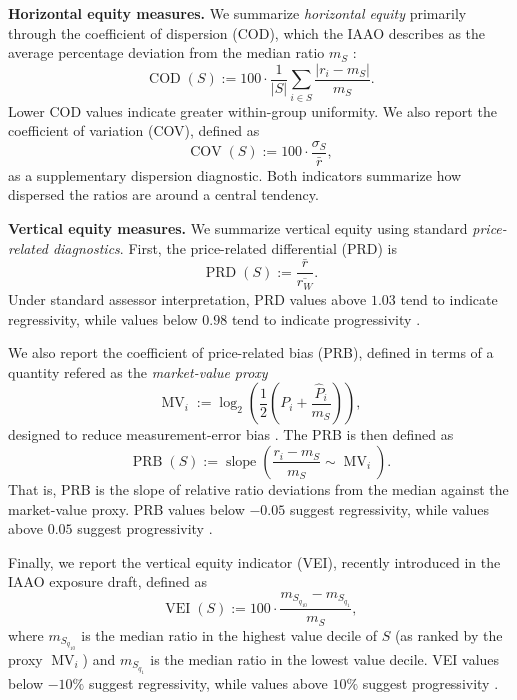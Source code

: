 \documentclass[12pt, draft]{article}
\theoremstyle{plain}
\theoremstyle{definition}
\newcommand{\1}{\mathbf{1}}
\begin{document}
{\medskip
\noindent\textbf{Horizontal equity measures.}
We summarize \textit{horizontal equity} primarily through the coefficient of dispersion (COD), which the IAAO describes as the average percentage deviation from the median ratio $m_S$ \cite{IAAO2013Ratio,IAAO2025ExposureRatio}:
\begin{equation}
\label{eq:cod}
\operatorname{COD}(S)
:=
100\cdot\frac{1}{|S|}
\sum_{i\in S}\frac{|r_i-m_S|}{m_S}.
\end{equation}
Lower COD values indicate greater within-group uniformity. We also report the coefficient of variation (COV), defined as
\begin{equation}
\label{eq:cov_metric}
\operatorname{COV}(S)
:=
100\cdot\frac{\sigma_S}{\bar r},
\end{equation}
as a supplementary dispersion diagnostic. Both indicators summarize how dispersed the ratios are around a central tendency.

\medskip
\noindent\textbf{Vertical equity measures.}
We summarize vertical equity using standard \textit{price-related diagnostics}. First, the price-related differential (PRD) is
\begin{equation}
\label{eq:prd}
\operatorname{PRD}(S)
:=
\frac{\bar r}{\overline{r_W}}.
\end{equation}
Under standard assessor interpretation, PRD values above $1.03$ tend to indicate regressivity, while values below $0.98$ tend to indicate progressivity \cite{IAAO2013Ratio,IAAO2025ExposureRatio}.

We also report the coefficient of price-related bias (PRB), defined in terms of a quantity refered as the \textit{market-value proxy} \cite{IAAO2025ExposureRatio}
\[
\operatorname{MV}_i
:=
\log_2\!\left(\frac{1}{2}\left(P_i+\frac{\widehat P_i}{m_S}\right)\right),
\]
designed to reduce measurement-error bias \cite{IAAO2025ExposureRatio}. The PRB is then defined as
\begin{equation}
\label{eq:prb}
\operatorname{PRB}(S)
:=
\operatorname{slope}\!\left(\frac{r_i-m_S}{m_S}\sim \operatorname{MV}_i\right).
\end{equation}
That is, PRB is the slope of relative ratio deviations from the median against the market-value proxy. PRB values below $-0.05$ suggest regressivity, while values above $0.05$ suggest progressivity \cite{IAAO2013Ratio,IAAO2025ExposureRatio}.

Finally, we report the vertical equity indicator (VEI), recently introduced in the IAAO exposure draft, defined as
\begin{equation}
\label{eq:vei}
\operatorname{VEI}(S)
:=
100\cdot\frac{m_{S_{q_{10}}}-m_{S_{q_1}}}{m_S},
\end{equation}
where $m_{S_{q_{10}}}$ is the median ratio in the highest value decile of $S$ (as ranked by the proxy $\operatorname{MV}_i$) and $m_{S_{q_1}}$ is the median ratio in the lowest value decile. VEI values below $-10\%$ suggest regressivity, while values above $10\%$ suggest progressivity \cite{IAAO2025ExposureRatio}.

}
\end{document}
